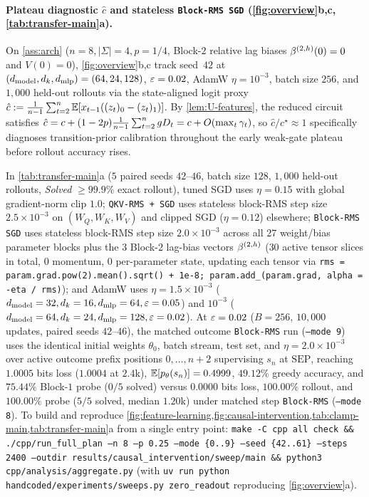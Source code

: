 \paragraph{Plateau diagnostic $\hat c$ and stateless \texttt{Block-RMS SGD} (\cref{fig:overview}b,c, \cref{tab:transfer-main}a).}
On \cref{ass:arch} ($n=8, |\Sigma|=4, p=1/4$, Block-$2$ relative lag biases $\beta^{(2,h)}(0)=0$ and $V(0)=0$), \cref{fig:overview}b,c track seed~$42$ at $(d_{\mathrm{model}}, d_k, d_{\mathrm{mlp}}) = (64, 24, 128)$, $\varepsilon = 0.02$, AdamW $\eta = 10^{-3}$, batch size $256$, and $1{,}000$ held-out rollouts via the state-aligned logit proxy $\hat c := \frac{1}{n-1}\sum_{t=2}^n \mathbb E[x_{t-1}((z_t)_0 - (z_t)_1)]$. By \cref{lem:U-features}, the reduced circuit satisfies $\hat c = c + (1-2p)\frac{1}{n-1}\sum_{t=2}^n g D_t = c + O(\max_t\gamma_t)$, so $\hat c/c^\star \approx 1$ specifically diagnoses transition-prior calibration throughout the early weak-gate plateau before rollout accuracy rises.

In \cref{tab:transfer-main}a ($5$ paired seeds $42$--$46$, batch size $128$, $1{,}000$ held-out rollouts, \emph{Solved} $\ge 99.9\%$ exact rollout), tuned SGD uses $\eta=0.15$ with global gradient-norm clip $1.0$; \texttt{QKV-RMS + SGD} uses stateless block-RMS step size $2.5\times 10^{-3}$ on $(W_Q, W_K, W_V)$ and clipped SGD ($\eta=0.12$) elsewhere; \texttt{Block-RMS SGD} uses stateless block-RMS step size $2.0\times 10^{-3}$ across all $27$ weight/bias parameter blocks plus the $3$ Block-$2$ lag-bias vectors $\beta^{(2,h)}$ ($30$ active tensor slices in total, $0$ momentum, $0$ per-parameter state, updating each tensor via \texttt{rms = param.grad.pow(2).mean().sqrt() + 1e-8; param.add\_(param.grad, alpha = -eta / rms)}); and AdamW uses $\eta = 1.5\times 10^{-3}$ ($d_{\mathrm{model}}=32, d_k=16, d_{\mathrm{mlp}}=64, \varepsilon=0.05$) and $10^{-3}$ ($d_{\mathrm{model}}=64, d_k=24, d_{\mathrm{mlp}}=128, \varepsilon=0.02$). At $\varepsilon = 0.02$ ($B = 256$, $10{,}000$ updates, paired seeds $42$--$46$), the matched outcome \texttt{Block-RMS} run (\texttt{--mode 9}) uses the identical initial weights $\theta_0$, batch stream, test set, and $\eta = 2.0\times 10^{-3}$ over active outcome prefix positions $0,\ldots,n+2$ supervising $s_n$ at $\mathrm{SEP}$, reaching $1.0005$ bits loss ($1.0004$ at $2.4$k), $\mathbb E[p_\theta(s_n)] = 0.4999$, $49.12\%$ greedy accuracy, and $75.44\%$ Block-$1$ probe ($0/5$ solved) versus $0.0000$ bits loss, $100.00\%$ rollout, and $100.00\%$ probe ($5/5$ solved, median $1.20$k) under matched step \texttt{Block-RMS} (\texttt{--mode 8}). To build and reproduce \cref{fig:feature-learning,fig:causal-intervention,tab:clamp-main,tab:transfer-main}a from a single entry point: \texttt{make -C cpp all check \&\& ./cpp/run\_full\_plan --n 8 --p 0.25 --mode \{0..9\} --seed \{42..61\} --steps 2400 --outdir results/causal\_intervention/sweep/main \&\& python3 cpp/analysis/aggregate.py} (with \texttt{uv run python handcoded/experiments/sweeps.py zero\_readout} reproducing \cref{fig:overview}a).

